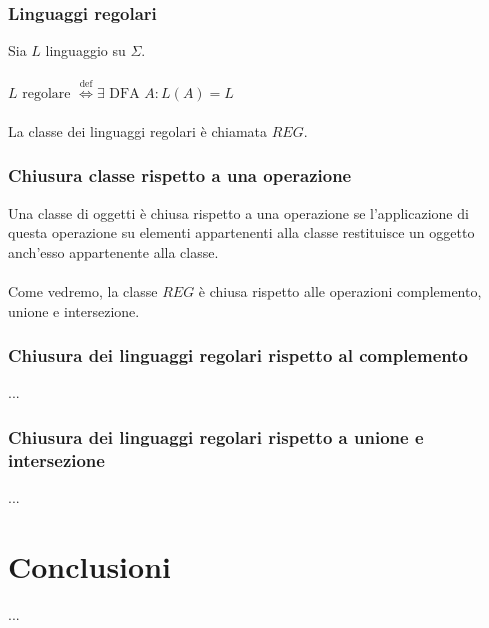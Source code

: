 \documentclass[]{article}
\begin{document}
\newpage


\subsubsection{Linguaggi regolari}

Sia \mbox{$ L $} linguaggio su \mbox{$ \Sigma $}.
\\
\\
\mbox{$ L \text{ regolare }
\overset{\text{def}}{\Leftrightarrow}
\exists \text{ DFA } A \colon L(A) = L $}
\\
\\
La classe dei linguaggi regolari è chiamata \mbox{$ REG $}.



\subsubsection{Chiusura classe rispetto a una operazione}

Una classe di oggetti è chiusa rispetto a una operazione se l'applicazione di questa operazione su
elementi appartenenti alla classe restituisce un oggetto anch'esso appartenente alla classe.
\\
\\
Come vedremo, la classe \mbox{$ REG $} è chiusa rispetto alle operazioni complemento, unione
e intersezione.



\subsubsection{Chiusura dei linguaggi regolari rispetto al complemento}

...



\subsubsection{Chiusura dei linguaggi regolari rispetto a unione e intersezione}

...



\section*{Conclusioni}

...
\end{document}
